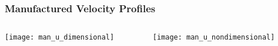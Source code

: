 \documentclass[mathserif]{beamer}
\begin{document}

	 


 \begin{frame}
   \frametitle{Manufactured Velocity Profiles}

  \begin{columns}[c]
    \begin{column}{5cm}
    \begin{center}
     \texttt{[image: man\_u\_dimensional]} \\
    \end{center}
    \end{column}

   \begin{column}{5cm}
    \begin{center}
     \texttt{[image: man\_u\_nondimensional]} \\
    \end{center}
   \end{column}
  \end{columns}
    
 \end{frame}
\end{document}
